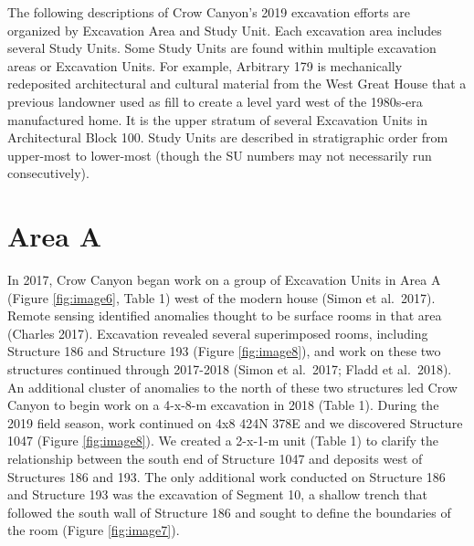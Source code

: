 \documentclass[
  12pt,
]{krantz}
\begin{document}
The following descriptions of Crow Canyon's 2019 excavation efforts are
organized by Excavation Area and Study Unit. Each excavation area
includes several Study Units. Some Study Units are found within multiple
excavation areas or Excavation Units. For example, Arbitrary 179 is
mechanically redeposited architectural and cultural material from the
West Great House that a previous landowner used as fill to create a
level yard west of the 1980s-era manufactured home. It is the upper
stratum of several Excavation Units in Architectural Block 100. Study
Units are described in stratigraphic order from upper-most to lower-most
(though the SU numbers may not necessarily run consecutively).

\hypertarget{area-a}{%
\section{Area A}\label{area-a}}

In 2017, Crow Canyon began work on a group of Excavation Units in Area A
(Figure \ref{fig:image6}, Table 1) west of the modern house (Simon et al.~2017). Remote
sensing identified anomalies thought to be surface rooms in that area
(Charles 2017). Excavation revealed several superimposed rooms,
including Structure 186 and Structure 193 (Figure \ref{fig:image8}), and work on these
two structures continued through 2017-2018 (Simon et al.~2017; Fladd et
al.~2018). An additional cluster of anomalies to the north of these two
structures led Crow Canyon to begin work on a 4-x-8-m excavation in 2018
(Table 1). During the 2019 field season, work continued on 4x8 424N 378E
and we discovered Structure 1047 (Figure \ref{fig:image8}). We created a 2-x-1-m unit
(Table 1) to clarify the relationship between the south end of Structure
1047 and deposits west of Structures 186 and 193. The only additional
work conducted on Structure 186 and Structure 193 was the excavation of
Segment 10, a shallow trench that followed the south wall of Structure
186 and sought to define the boundaries of the room (Figure \ref{fig:image7}).
\end{document}

